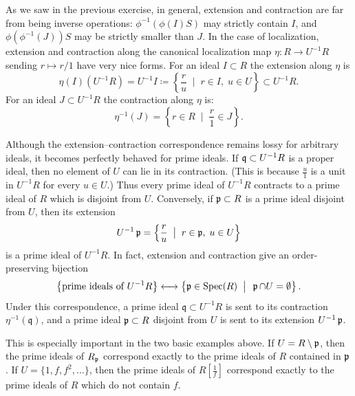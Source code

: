 \documentclass[Notebook.tex]{subfiles}
\begin{document}
\newpage

\hrulefill

	As we saw in the previous exercise, in general, extension and contraction are far from being inverse operations: $\phi^{-1}(\phi(I)S)$ may strictly contain $I$, and $\phi(\phi^{-1}(J))S$ may be strictly smaller than $J$. In the case of localization, extension and contraction along the canonical localization map $\eta:R\to U^{-1}R$ sending $r\mapsto r/1$ have very nice forms. For an ideal $I \subset R$ the extension along $\eta$ is
	\[
	\eta(I)\left(U^{-1}R\right)= U^{-1}I\coloneqq \left\{\frac{r}{u}\;\; \big|\;\; r\in I,\; u\in U\right\}\subset U^{-1}R.
	\]
	For an ideal $J \subset U^{-1}R$ the contraction along $\eta$ is:
	\[
	\eta^{-1}(J) = \left\{r\in R\;\; \big|\;\; \frac{r}{1} \in J\right\}.
	\]

	Although the extension--contraction correspondence remains lossy for arbitrary ideals, it becomes perfectly behaved for prime ideals. If $\operatorname{\mathfrak{q}} \subset U^{-1}R$ is a proper ideal, then no element of $U$ can lie in its contraction. (This is because $\frac{u}{1}$ is a unit in $U^{-1}R$ for every $u\in U$.) Thus every prime ideal of $U^{-1}R$ contracts to a prime ideal of $R$ which is disjoint from $U$. Conversely, if $\operatorname{\mathfrak{p}}\subset R$ is a prime ideal disjoint from $U$, then its extension
	\[
	U^{-1}\operatorname{\mathfrak{p}}=\left\{\frac{r}{u}\;\; \big|\;\; r\in \operatorname{\mathfrak{p}},\; u\in U\right\}
	\]
	is a prime ideal of $U^{-1}R$. In fact, extension and contraction give an order-preserving bijection
	\[
	\left\{\text{prime ideals of }U^{-1}R\right\}
	\longleftrightarrow
	\left\{\operatorname{\mathfrak{p}}\in \operatorname{Spec}(R)\;\; \big|\;\; \operatorname{\mathfrak{p}}\cap U=\emptyset\right\}.
	\]
	Under this correspondence, a prime ideal $\mathfrak{q}\subset U^{-1}R$ is sent to its contraction $\eta^{-1}(\mathfrak{q})$, and a prime ideal $\operatorname{\mathfrak{p}}\subset R$ disjoint from $U$ is sent to its extension $U^{-1}\operatorname{\mathfrak{p}}$.

	This is especially important in the two basic examples above. If $U=R\setminus \operatorname{\mathfrak{p}}$, then the prime ideals of $R_{\operatorname{\mathfrak{p}}}$ correspond exactly to the prime ideals of $R$ contained in $\operatorname{\mathfrak{p}}$. If $U=\{1,f,f^2,\ldots\}$, then the prime ideals of $R[\frac{1}{f}]$ correspond exactly to the prime ideals of $R$ which do not contain $f$.

\hrulefill

\newpage 
\end{document}
